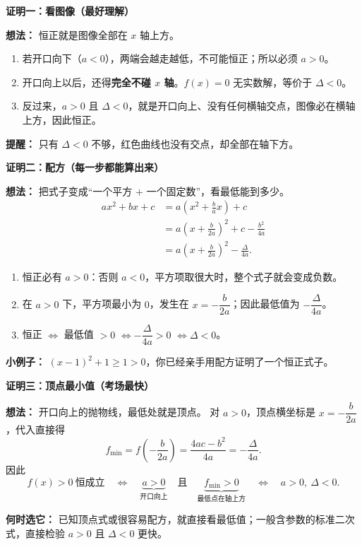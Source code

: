 \begin{proofbox}
  \textbf{\textcolor{CProof}{证明一：看图像（最好理解）}}

  \textbf{想法：} 恒正就是图像全部在 $x$ 轴上方。
  \begin{enumerate}[leftmargin=*,itemsep=0.3em]
    \item 若开口向下（$a<0$），两端会越走越低，不可能恒正；所以必须 $a>0$。
    \item 开口向上以后，还得\textbf{完全不碰 $x$ 轴}。$f(x)=0$ 无实数解，等价于 $\Delta<0$。
    \item 反过来，$a>0$ 且 $\Delta<0$，就是开口向上、没有任何横轴交点，图像必在横轴上方，因此恒正。
  \end{enumerate}
  \begin{center}
  
  \end{center}
  \textbf{提醒：} 只有 $\Delta<0$ 不够，红色曲线也没有交点，却全部在轴下方。

  \medskip
  \textbf{\textcolor{CProof}{证明二：配方（每一步都能算出来）}}

  \textbf{想法：} 把式子变成“一个平方 $+$ 一个固定数”，看最低能到多少。
  \[
    \begin{aligned}
      ax^2+bx+c
      &=a\left(x^2+\frac ba x\right)+c\\
      &=a\left(x+\frac{b}{2a}\right)^2+c-\frac{b^2}{4a}\\
      &=a\left(x+\frac{b}{2a}\right)^2-\frac{\Delta}{4a}.
    \end{aligned}
  \]
  \begin{enumerate}[leftmargin=*,itemsep=0.3em]
    \item 恒正必有 $a>0$：否则 $a<0$，平方项取很大时，整个式子就会变成负数。
    \item 在 $a>0$ 下，平方项最小为 $0$，发生在 $x=-\dfrac b{2a}$；因此最低值为 $-\dfrac\Delta{4a}$。
    \item 恒正 $\Longleftrightarrow$ 最低值 $>0$ $\Longleftrightarrow -\dfrac\Delta{4a}>0$ $\Longleftrightarrow \Delta<0$。
  \end{enumerate}
  \begin{center}
  
  \end{center}
  \textbf{小例子：} $(x-1)^2+1\ge1>0$，你已经亲手用配方证明了一个恒正式子。

  \medskip
  \textbf{\textcolor{CProof}{证明三：顶点最小值（考场最快）}}

  \textbf{想法：} 开口向上的抛物线，最低处就是顶点。
  对 $a>0$，顶点横坐标是 $x=-\dfrac{b}{2a}$，代入直接得
  \[
     f_{\min}=f\left(-\frac{b}{2a}\right)=\frac{4ac-b^2}{4a}=-\frac{\Delta}{4a}.
  \]
  因此
  \[
    f(x)>0\ \text{恒成立}\quad\Longleftrightarrow\quad
    \underbrace{a>0}_{\text{开口向上}}\quad\text{且}\quad
    \underbrace{f_{\min}>0}_{\text{最低点在轴上方}}\quad\Longleftrightarrow\quad
    a>0,\ \Delta<0.
  \]
  \begin{center}
  
  \end{center}
  \textbf{何时选它：} 已知顶点式或很容易配方，就直接看最低值；一般含参数的标准二次式，直接检验 $a>0$ 且 $\Delta<0$ 更快。
\end{proofbox}
